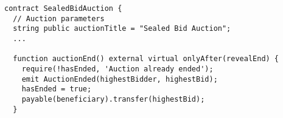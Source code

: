 \begin{lstlisting}[language=Solidity]
contract SealedBidAuction {
  // Auction parameters
  string public auctionTitle = "Sealed Bid Auction";
  ... 
  
  function auctionEnd() external virtual onlyAfter(revealEnd) {
    require(!hasEnded, 'Auction already ended');
    emit AuctionEnded(highestBidder, highestBid);
    hasEnded = true;
    payable(beneficiary).transfer(highestBid);
  }
\end{lstlisting}